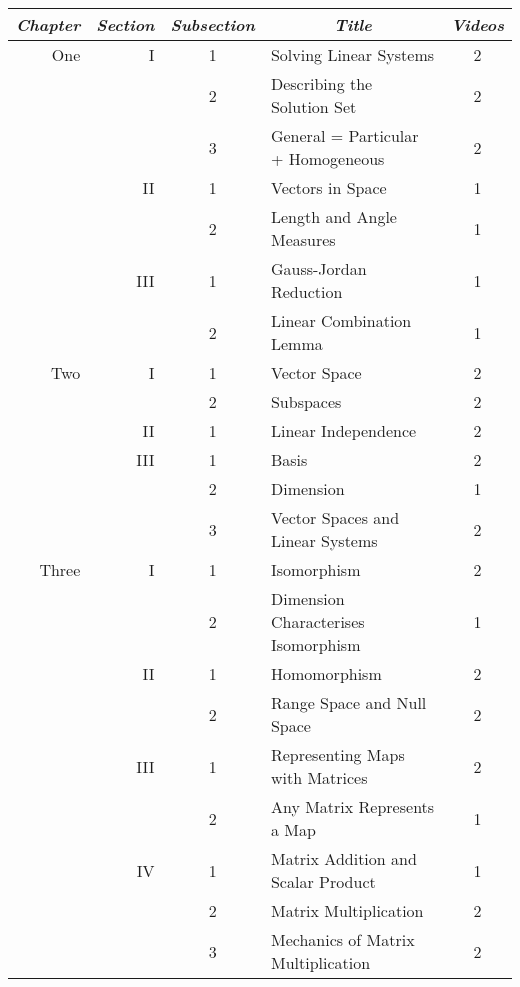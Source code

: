 \documentclass{article}
\begin{document}
\begin{center}
\begin{tabular}{|rrc|lc|}
  \multicolumn{1}{c}{\textit{Chapter}} 
  &\multicolumn{1}{c}{\textit{Section}} 
  &\multicolumn{1}{c}{\textit{Subsection}} 
  &\multicolumn{1}{c}{\textit{Title}} 
  &\multicolumn{1}{c}{\textit{Videos}} 
  \\ \hline
  One &I   &1 &Solving Linear Systems             &2   \\
      &    &2 &Describing the Solution Set        &2   \\
      &    &3 &General = Particular + Homogeneous &2   \\
      \cline{4-5}
      &II  &1  &Vectors in Space                  &1   \\
      &    &2  &Length and Angle Measures         &1   \\
      \cline{4-5}
      &III &1  &Gauss-Jordan Reduction            &1   \\
      &    &2  &Linear Combination Lemma          &1   \\
 \hline
 Two  &I   &1 &Vector Space                       &2   \\
      &    &2 &Subspaces                          &2   \\
      \cline{4-5}
      &II  &1 &Linear Independence                &2   \\
      \cline{4-5}
      &III &1 &Basis                              &2   \\
      &    &2 &Dimension                          &1   \\
      &    &3 &Vector Spaces and Linear Systems   &2   \\
 \hline
 Three&I   &1 &Isomorphism                        &2   \\
      &    &2 &Dimension Characterises Isomorphism&1   \\
      \cline{4-5}
      &II  &1 &Homomorphism                       &2   \\
      &    &2 &Range Space and Null Space         &2   \\
      \cline{4-5}
      &III &1 &Representing Maps with Matrices    &2   \\
      &    &2 &Any Matrix Represents a Map        &1   \\
      \cline{4-5}
      &IV  &1 &Matrix Addition and Scalar Product &1   \\
      &    &2 &Matrix Multiplication              &2   \\
      &    &3 &Mechanics of Matrix Multiplication &2   \\

\end{tabular}
\end{center}
\end{document}
